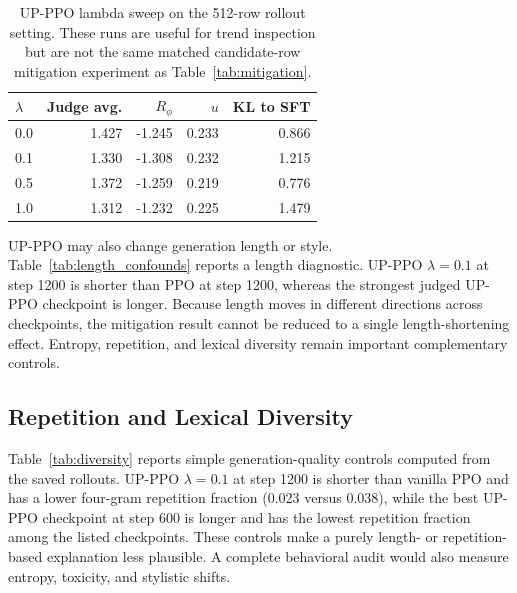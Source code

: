 \documentclass[twocolumn,10pt]{article}
\newcommand{\Rphi}{R_{\phi}}
\begin{document}
\begin{table}[!tbp]
\centering
\scriptsize
\caption{UP-PPO lambda sweep on the 512-row rollout setting. These runs are useful for trend inspection but are not the same matched candidate-row mitigation experiment as Table~\ref{tab:mitigation}.}
\label{tab:lambda_curve}
\begin{tabular}{lrrrr}
\toprule
$\lambda$ & Judge avg. & $\Rphi$ & $u$ & KL to SFT \\
\midrule
0.0 & 1.427 & -1.245 & 0.233 & 0.866 \\
0.1 & 1.330 & -1.308 & 0.232 & 1.215 \\
0.5 & 1.372 & -1.259 & 0.219 & 0.776 \\
1.0 & 1.312 & -1.232 & 0.225 & 1.479 \\
\bottomrule
\end{tabular}
\end{table}

UP-PPO may also change generation length or style. Table~\ref{tab:length_confounds} reports a length diagnostic. UP-PPO $\lambda=0.1$ at step 1200 is shorter than PPO at step 1200, whereas the strongest judged UP-PPO checkpoint is longer. Because length moves in different directions across checkpoints, the mitigation result cannot be reduced to a single length-shortening effect. Entropy, repetition, and lexical diversity remain important complementary controls.

\begin{table}[!tbp]
\centering
\tiny
\caption{Generated-response length diagnostics for selected 64-row checkpoints.}
\label{tab:length_confounds}
\end{table}



\subsection{Repetition and Lexical Diversity}
Table~\ref{tab:diversity} reports simple generation-quality controls computed from the saved rollouts. UP-PPO $\lambda=0.1$ at step 1200 is shorter than vanilla PPO and has a lower four-gram repetition fraction (0.023 versus 0.038), while the best UP-PPO checkpoint at step 600 is longer and has the lowest repetition fraction among the listed checkpoints. These controls make a purely length- or repetition-based explanation less plausible. A complete behavioral audit would also measure entropy, toxicity, and stylistic shifts.
\end{document}
